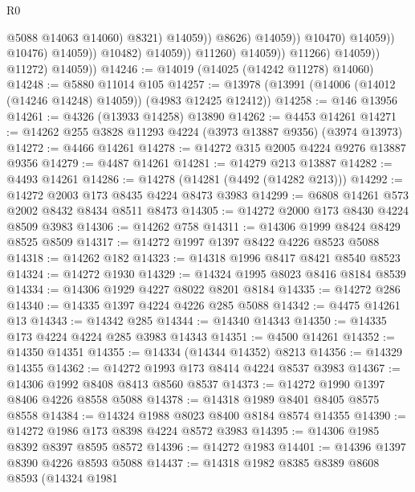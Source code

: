 \begin{lexlean}{R0}
\begin{coremodule}
                                                      @5088
                                                      @14063
                                                      @14060)
                                                    @8321)
                                                  @14059))
                                              @8626)
                                            @14059))
                                        @10470)
                                      @14059))
                                  @10476)
                                @14059))
                            @10482)
                          @14059))
                      @11260)
                    @14059))
                @11266)
              @14059))
          @11272)
        @14059))
@14246 := @14019 (@14025 (@14242 @11278) @14060)
@14248 := @5880 @11014 @105
@14257 := @13978 (@13991 (@14006 (@14012 (@14246 @14248) @14059)) (@4983 @12425 @12412))
@14258 := @146 @13956
@14261 := @4326 (@13933 @14258) @13890
@14262 := @4453 @14261
@14271 := @14262 @255 @3828 @11293 @4224 (@3973 @13887 @9356) (@3974 @13973)
@14272 := @4466 @14261
@14278 := @14272 @315 @2005 @4224 @9276 @13887 @9356
@14279 := @4487 @14261
@14281 := @14279 @213 @13887
@14282 := @4493 @14261
@14286 := @14278 (@14281 (@4492 (@14282 @213)))
@14292 := @14272 @2003 @173 @8435 @4224 @8473 @3983
@14299 := @6808 @14261 @573 @2002 @8432 @8434 @8511 @8473
@14305 := @14272 @2000 @173 @8430 @4224 @8509 @3983
@14306 := @14262 @758
@14311 := @14306 @1999 @8424 @8429 @8525 @8509
@14317 := @14272 @1997 @1397 @8422 @4226 @8523 @5088
@14318 := @14262 @182
@14323 := @14318 @1996 @8417 @8421 @8540 @8523
@14324 := @14272 @1930
@14329 := @14324 @1995 @8023 @8416 @8184 @8539
@14334 := @14306 @1929 @4227 @8022 @8201 @8184
@14335 := @14272 @286
@14340 := @14335 @1397 @4224 @4226 @285 @5088
@14342 := @4475 @14261 @13
@14343 := @14342 @285
@14344 := @14340 @14343
@14350 := @14335 @173 @4224 @4224 @285 @3983 @14343
@14351 := @4500 @14261
@14352 := @14350 @14351
@14355 := @14334 (@14344 @14352) @8213
@14356 := @14329 @14355
@14362 := @14272 @1993 @173 @8414 @4224 @8537 @3983
@14367 := @14306 @1992 @8408 @8413 @8560 @8537
@14373 := @14272 @1990 @1397 @8406 @4226 @8558 @5088
@14378 := @14318 @1989 @8401 @8405 @8575 @8558
@14384 := @14324 @1988 @8023 @8400 @8184 @8574 @14355
@14390 := @14272 @1986 @173 @8398 @4224 @8572 @3983
@14395 := @14306 @1985 @8392 @8397 @8595 @8572
@14396 := @14272 @1983
@14401 := @14396 @1397 @8390 @4226 @8593 @5088
@14437 := @14318
    @1982
    @8385
    @8389
    @8608
    @8593
    (@14324
      @1981

\end{coremodule}
\end{lexlean}

